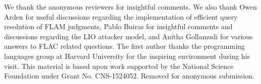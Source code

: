 \ifx\review\undefined
We thank the anonymous reviewers for insightful comments. We also thank Owen Arden for useful discussions regarding the implementation of efficient query resolution of FLAM judgments, Pablo Buiras for insightful comments and discussions regarding the LIO attacker model, and Anitha Gollamudi for various answers to FLAC related questions. The first author thanks the programming languages group at Harvard University for the inspiring environment during his visit. This material is based upon work supported by the National Science Foundation under Grant No. CNS-1524052.
\else
Removed for anonymous submission.
\fi